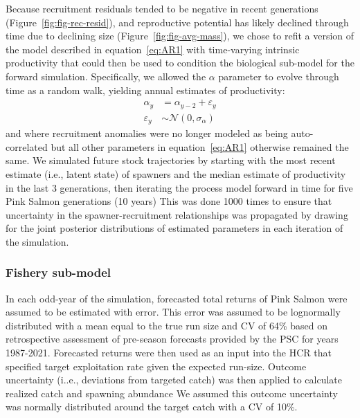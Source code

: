 \documentclass[11pt]{book}
\begin{document}
Because recruitment residuals tended to be negative in recent generations (Figure~\ref{fig:fig-rec-resid}), and reproductive potential has likely declined through time due to declining size (Figure~\ref{fig:fig-avg-mass}), we chose to refit a version of the model described in equation~\ref{eq:AR1} with time-varying intrinsic productivity that could then be used to condition the biological sub-model for the forward simulation. Specifically, we allowed the \(\alpha\) parameter to evolve through time as a random walk, yielding annual estimates of productivity:
\begin{equation}
\begin{aligned}
\alpha_y &= \alpha_{y-2} + \varepsilon_y \\
\varepsilon_y &\sim \mathcal{N}(0, \sigma_\alpha)
\end{aligned}
\label{eq:tv-alpha}
\end{equation}
and where recruitment anomalies were no longer modeled as being auto-correlated but all other parameters in equation~\ref{eq:AR1} otherwise remained the same. We simulated future stock trajectories by starting with the most recent estimate (i.e., latent state) of spawners and the median estimate of productivity in the last 3 generations, then iterating the process model forward in time for five Pink Salmon generations (10 years) This was done 1000 times to ensure that uncertainty in the spawner-recruitment relationships was propagated by drawing for the joint posterior distributions of estimated parameters in each iteration of the simulation.

\hypertarget{fishery-sub-model}{%
\subsubsection{Fishery sub-model}\label{fishery-sub-model}}

In each odd-year of the simulation, forecasted total returns of Pink Salmon were assumed to be estimated with error. This error was assumed to be lognormally distributed with a mean equal to the true run size and CV of 64\% based on retrospective assessment of pre-season forecasts provided by the PSC for years 1987-2021. Forecasted returns were then used as an input into the HCR that specified target exploitation rate given the expected run-size. Outcome uncertainty (i..e., deviations from targeted catch) was then applied to calculate realized catch and spawning abundance We assumed this outcome uncertainty was normally distributed around the target catch with a CV of 10\%.
\end{document}
